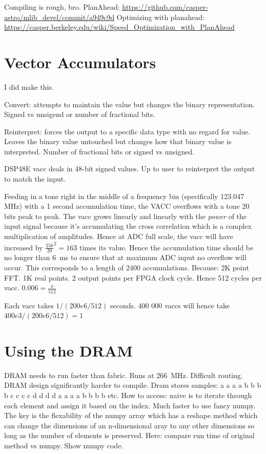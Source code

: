 Compiling is rough, bro.
PlanAhead: \url{https://github.com/casper-astro/mlib_devel/commit/a949c9d}
Optimizing with planahead: \url{https://casper.berkeley.edu/wiki/Speed_Optimization_with_PlanAhead}

\section{Vector Accumulators}
I did make this.

Convert: attempts to maintain the value but changes the binary representation. Signed vs unsigend or number of fractional bits. 

Reinterpret: forces the output to a specific data type with no regard for value. Leaves the binary value untouched but changes how that binary value is interpreted. Number of fractional bits or signed vs unsigned. 

DSP48E vacc deals in 48-bit signed values. Up to user to reinterpret the output to match the input. 

Feeding in a tone right in the middle of a frequency bin (specifically 123.047 MHz) with a 1 second accumulation time, the VACC overflows with a tone 20 bits peak to peak.
The vacc grows linearly and linearly with the \emph{power} of the input signal because it's accumulating the cross correlation which is a complex multiplication of amplitudes. 
Hence at ADC full scale, the vacc will have increased by \(\frac{256}{20}^2 = 163\) times its value.
Hence the accumulation time should be no longer than \SI{6}{\milli\second} to ensure that at maximum ADC input no overflow will occur. This corresponds to a length of 2400 accumulations.
Because: 2K point FFT. 1K real points. 2 output points per FPGA clock cycle. Hence 512 cycles per vacc.
\(0.006 = \frac{x}{512}\) 

Each vacc takes \(1 / (200e6 / 512)\) seconds. 400 000 vaccs will hence take \(400e3 / (200e6 / 512) = 1 \)

\section{Using the DRAM}
DRAM needs to run faster than fabric. Runs at \SI{266}{\mega\hertz}. Difficult routing. DRAM design significantly harder to compile. 
Dram stores samples: a a a a b b b b c c c c d d d d a a a a b b b b etc. 
How to access: naive is to iterate through each element and assign it based on the index.
Much faster to use fancy numpy. The key is the flexability of the numpy array which has a reshape method which can change the dimensions of an n-dimensional aray to any other dimensions so long as the number of elements is preserved. 
Here: compare run time of original method vs numpy. Show numpy code.

